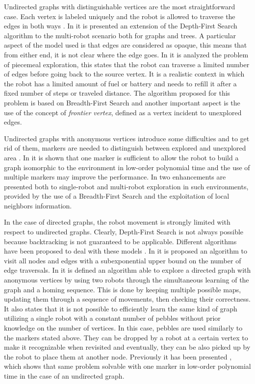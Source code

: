 Undirected graphs with distinguishable vertices are the most straightforward
case. Each vertex is labeled uniquely and the robot is allowed to
traverse the edges in both ways \cite{Dessmark2002,Fraigniaud2006}. In \cite{Brass2011} it is
presented an extension of the Depth-First Search algorithm to the
multi-robot scenario both for graphs and trees. A particular aspect
of the model used is that edges are considered as opaque, this means
that from either end, it is not clear where the edge goes. In \cite{Awerbuch1999}
it is analyzed the problem of piecemeal exploration, this states that
the robot can traverse a limited number of edges before going back
to the source vertex. It is a realistic context in which the robot
has a limited amount of fuel or battery and needs to refill it after
a fixed number of steps or traveled distance. The algorithm proposed
for this problem is based on Breadth-First Search and another important
aspect is the use of the concept of \emph{frontier vertex}, defined
as a vertex incident to unexplored edges.

Undirected graphs with anonymous vertices introduce some difficulties
and to get rid of them, markers are needed to distinguish between
explored and unexplored area \cite{Wang2008,Dudek1991,Hoffmann1981}. In \cite{Dudek1991} it is
shown that one marker is sufficient to allow the robot to build a
graph isomorphic to the environment in low-order polynomial time and
the use of multiple markers may improve the performance. In \cite{Wang2008}
two enhancements are presented both to single-robot and multi-robot
exploration in such environments, provided by the use of a Breadth-First
Search and the exploitation of local neighbors information.

In the case of directed graphs, the robot movement is strongly limited
with respect to undirected graphs. Clearly, Depth-First Search is
not always possible because backtracking is not guaranteed to be applicable.
Different algorithms have been proposed to deal with these models
\cite{Albers2000,Bender,Deng1999}. In \cite{Albers2000} it is proposed an algorithm to visit
all nodes and edges with a subexponential upper bound on the number
of edge traversals. In \cite{Bender} it is defined an algorithm able
to explore a directed graph with anonymous vertices by using two robots
through the simultaneous learning of the graph and a homing sequence.
This is done by keeping multiple possible maps, updating them through
a sequence of movements, then checking their correctness. It also
states that it is not possible to efficiently learn the same kind
of graph utilizing a single robot with a constant number of pebbles
without prior knowledge on the number of vertices. In this case, pebbles
are used similarly to the markers stated above. They can be dropped
by a robot at a certain vertex to make it recognizable when revisited
and eventually, they can be also picked up by the robot to place them
at another node. Previously it has been presented \cite{Dudek1991}, which
shows that same problem solvable with one marker in low-order polynomial
time in the case of an undirected graph. 

